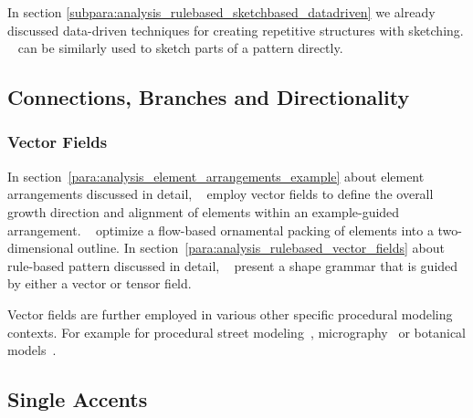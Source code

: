 
In section \ref{subpara:analysis_rulebased_sketchbased_datadriven} we already discussed data-driven techniques for creating repetitive structures with sketching. ~\cite{kazi_2012_vit, xing_2014_apr, xing_2015_aha} can be similarly used to sketch parts of a pattern directly.

\subsection{Connections, Branches and Directionality}
\label{subsec:analysis_connections_branches_and_directionality}




\subsubsection{Vector Fields}
\label{subsec:analysis_connections_branches_and_directionality_vectorfields}

In section~\ref{para:analysis_element_arrangements_example} about element arrangements discussed in detail, \citeauthor*{ijiri_2008_aeb}~\cite{ijiri_2008_aeb} employ vector fields to define the overall growth direction and alignment of elements within an example-guided arrangement. \citeauthor*{saputra_2017_ffo}~\cite{saputra_2017_ffo} optimize a flow-based ornamental packing of elements into a two-dimensional outline. In section~\ref{para:analysis_rulebased_vector_fields} about rule-based pattern discussed in detail, \citeauthor*{yuanyuan_2011_gso}~\cite{yuanyuan_2011_gso} present a shape grammar that is guided by either a vector or tensor field.


Vector fields are further employed in various other specific procedural modeling contexts. For example for procedural street modeling~\cite{chen_2008_ips}, micrography~\cite{maharik_2011_dm} or botanical models~\cite{xu_2015_ptm}.



\subsection{Single Accents}
\label{subsec:analysis_single_accents}

